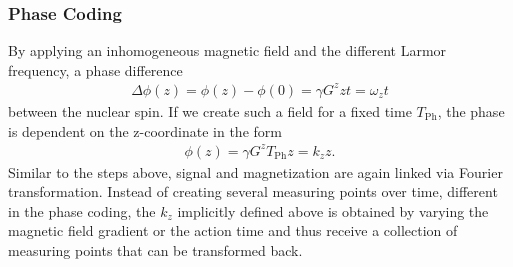 \subsubsection{Phase Coding}
By applying an inhomogeneous magnetic field and the different Larmor frequency, a phase difference
\begin{align}
\Delta \phi(z)=\phi(z)-\phi(0)=\gamma G^z zt=\omega_z t
\end{align}
between the nuclear spin.
If we create such a field for a fixed time $T_\text{Ph}$, the phase is dependent on the z-coordinate in the form
\begin{align}
\phi(z)=\gamma G^z T_\text{Ph} z=k_z z.
\end{align}
Similar to the steps above, signal and magnetization are again linked via Fourier transformation.
Instead of creating several measuring points over time, different
in the phase coding, the $k_z$ implicitly defined above is obtained by varying the magnetic field gradient
or the action time and thus receive a collection of measuring points that can be transformed back.

